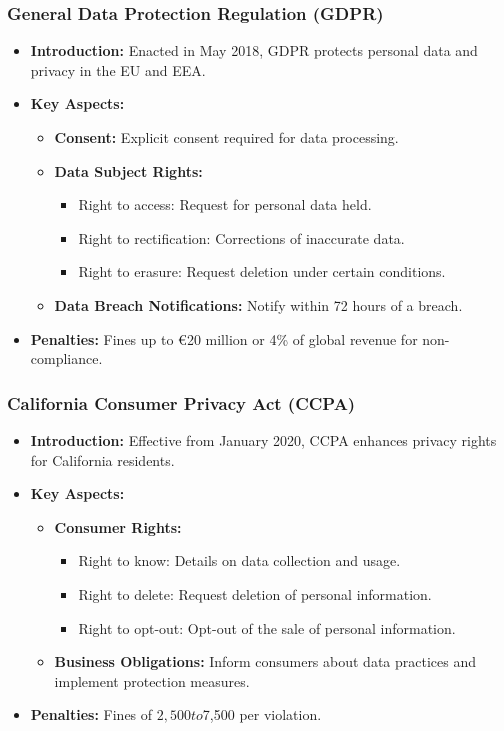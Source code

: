 \documentclass[aspectratio=169]{beamer}
\begin{document}
\begin{frame}[fragile]
  \frametitle{General Data Protection Regulation (GDPR)}
  \begin{itemize}
    \item \textbf{Introduction:} Enacted in May 2018, GDPR protects personal data and privacy in the EU and EEA.
    \item \textbf{Key Aspects:}
      \begin{itemize}
        \item \textbf{Consent:} Explicit consent required for data processing.
        \item \textbf{Data Subject Rights:}
          \begin{itemize}
            \item Right to access: Request for personal data held.
            \item Right to rectification: Corrections of inaccurate data.
            \item Right to erasure: Request deletion under certain conditions.
          \end{itemize}
        \item \textbf{Data Breach Notifications:} Notify within 72 hours of a breach.
      \end{itemize}
    \item \textbf{Penalties:} Fines up to €20 million or 4\% of global revenue for non-compliance.
  \end{itemize}
\end{frame}

\begin{frame}[fragile]
  \frametitle{California Consumer Privacy Act (CCPA)}
  \begin{itemize}
    \item \textbf{Introduction:} Effective from January 2020, CCPA enhances privacy rights for California residents.
    \item \textbf{Key Aspects:}
      \begin{itemize}
        \item \textbf{Consumer Rights:}
          \begin{itemize}
            \item Right to know: Details on data collection and usage.
            \item Right to delete: Request deletion of personal information.
            \item Right to opt-out: Opt-out of the sale of personal information.
          \end{itemize}
        \item \textbf{Business Obligations:} Inform consumers about data practices and implement protection measures.
      \end{itemize}
    \item \textbf{Penalties:} Fines of $2,500 to $7,500 per violation.
  \end{itemize}
\end{frame}
\end{document}
